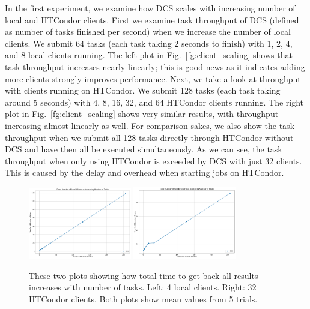 \documentclass{article}
\begin{document}
In the first experiment, we examine how DCS scales with increasing number of local and HTCondor clients. First we examine task throughput of DCS (defined as number of tasks finished per second) when we increase the number of local clients. We submit 64 tasks (each task taking 2 seconds to finish) with 1, 2, 4, and 8 local clients running. The left plot in Fig.~\ref{fg:client_scaling} shows that task throughput increases nearly linearly; this is good news as it indicates adding more clients strongly improves performance. Next, we take a look at throughput with clients running on HTCondor. We submit 128 tasks (each task taking around 5 seconds) with 4, 8, 16, 32, and 64 HTCondor clients running. The right plot in Fig.~\ref{fg:client_scaling} shows very similar results, with throughput increasing almost linearly as well. For comparison sakes, we also show the task throughput when we submit all 128 tasks directly through HTCondor without DCS and have then all be executed simultaneously. As we can see, the task throughput when only using HTCondor is exceeded by DCS with just 32 clients. This is caused by the delay and overhead when starting jobs on HTCondor.

\begin{figure}[t]
  \begin{center}
    \includegraphics[width=0.4\textwidth]{task_scaling_local.png}
    \includegraphics[width=0.4\textwidth]{task_scaling_condor.png}
    \caption{These two plots showing how total time to get back all results increases with number of tasks. Left: 4 local clients. Right: 32 HTCondor clients. Both plots show mean values from 5 trials.}
    \label{fg:task_scaling}
  \end{center}
\end{figure}
\end{document}
